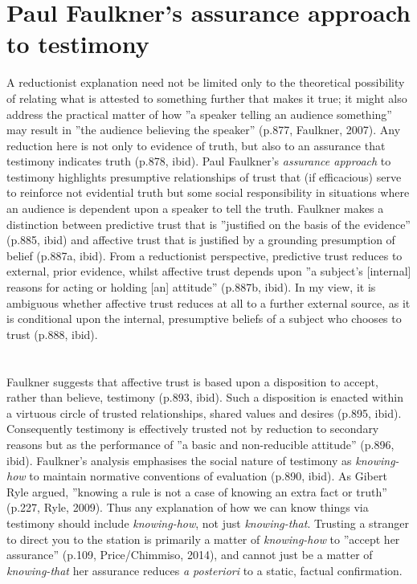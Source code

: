 \documentclass[a4paper, 11pt]{article} %
\begin{document}
\section*{Paul Faulkner's assurance approach to testimony}

A reductionist explanation need not be limited only to the theoretical possibility of relating what is attested to something further that makes it true; it might also address the practical matter of how ''a speaker telling an audience something'' may result in ''the audience believing the speaker'' (p.877, Faulkner, 2007)\cite{Faulkner:2007}. Any reduction here is not only to evidence of truth, but also to an assurance that testimony indicates truth (p.878, ibid)\cite{Faulkner:2007}. Paul Faulkner's \textit{assurance approach} to testimony highlights presumptive relationships of trust that (if efficacious) serve to reinforce not evidential truth but some social responsibility in situations where an audience is dependent upon a speaker to tell the truth. Faulkner makes a distinction between predictive trust that is ''justified on the basis  of the evidence'' (p.885, ibid)\cite{Faulkner:2007} and affective trust that is justified by a grounding presumption of belief (p.887a, ibid)\cite{Faulkner:2007}. From a reductionist perspective, predictive trust reduces to external, prior evidence, whilst affective trust depends upon ''a subject's [internal] reasons for acting or holding [an] attitude'' (p.887b, ibid)\cite{Faulkner:2007}. In my view, it is ambiguous whether affective trust reduces at all to a further external source, as it is conditional upon the internal, presumptive beliefs of a subject who chooses to trust (p.888, ibid)\cite{Faulkner:2007}. 

\section*{}

Faulkner suggests that affective trust is based upon a disposition to accept, rather than believe, testimony (p.893, ibid)\cite{Faulkner:2007}. Such a disposition is enacted within a virtuous circle of trusted relationships, shared values and desires (p.895, ibid)\cite{Faulkner:2007}. Consequently testimony is effectively trusted not by reduction to secondary reasons but as the performance of ''a basic and non-reducible attitude'' (p.896, ibid)\cite{Faulkner:2007}. Faulkner's analysis emphasises the social nature of testimony as \textit{knowing-how} to maintain normative conventions of evaluation (p.890, ibid). As Gibert Ryle argued, ''knowing a rule is not a case of knowing an extra fact or truth'' (p.227, Ryle, 2009)\cite{Ryle:2009}. Thus any explanation of how we can know things via testimony should include \textit{knowing-how}, not just \textit{knowing-that}. Trusting a stranger to direct you to the station is primarily a matter of \textit{knowing-how} to ''accept her assurance'' (p.109, Price/Chimmiso, 2014)\cite{Price/Chismisso:2014}, and cannot just be a matter of \textit{knowing-that} her assurance reduces \textit{a posteriori} to a static, factual confirmation. 
\end{document}
